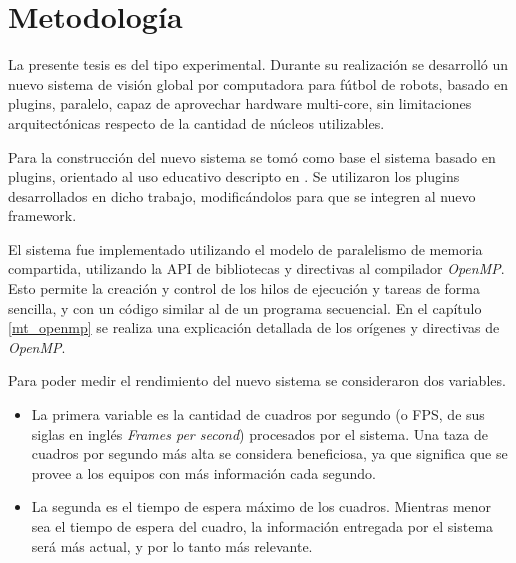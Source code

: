 
\section{Metodología}

\label{metodologia}

La presente tesis es del tipo experimental. Durante su realización se desarrolló
un nuevo sistema de visión global por computadora para fútbol de robots, basado
en plugins, paralelo, capaz de aprovechar hardware multi-core, sin limitaciones
arquitectónicas respecto de la cantidad de núcleos utilizables.

Para la construcción del nuevo sistema se tomó como base el sistema basado en
plugins, orientado al uso educativo descripto en \cite{torres2014}. Se
utilizaron los plugins desarrollados en dicho trabajo, modificándolos para que
se integren al nuevo framework.

El sistema fue implementado utilizando el modelo de paralelismo de memoria
compartida, utilizando la API de bibliotecas y directivas al compilador
\emph{OpenMP}. Esto permite la creación y control de los hilos de ejecución y
tareas de forma sencilla, y con un código similar al de un programa secuencial.
En el capítulo \ref{mt_openmp} se realiza una explicación detallada de los
orígenes y directivas de \emph{OpenMP}.

Para poder medir el rendimiento del nuevo sistema se consideraron dos variables.

\begin {itemize}

	\item	La primera variable es la cantidad de cuadros por segundo (o
		FPS, de sus siglas en inglés \emph{Frames per second})
		procesados por el sistema. Una taza de cuadros por segundo más
		alta se considera beneficiosa, ya que significa que se provee a
		los equipos con más información cada segundo.

	\item	La segunda es el tiempo de espera máximo de los cuadros.
		Mientras menor sea el tiempo de espera del cuadro, la
		información entregada por el sistema será más actual, y por lo
		tanto más relevante.

\end {itemize}
